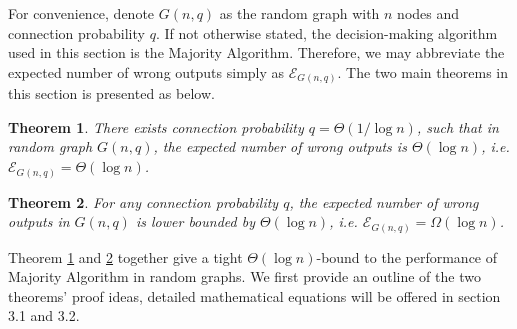 \documentclass[a4paper,UKenglish]{lipics}
\newtheorem{thm}{Theorem}[section] %
\theoremstyle{definition}
\begin{document}
For convenience, denote $G(n, q)$ as the random graph with $n$ nodes and connection probability $q$.
If not otherwise stated, the decision-making algorithm used in this section is the Majority Algorithm.
Therefore, we may abbreviate the expected number of wrong outputs simply as $\mathcal{E}_{G(n,q)}$.
The two main theorems in this section is presented as below.

\begin{thm}
\label{thm:random graph log n reachable}
There exists connection probability $q = \Theta(1/\log n)$, such that in random graph $G(n, q)$, 
	the expected number of wrong outputs is $\Theta(\log n)$,	
	i.e. $\mathcal{E}_{G(n,q)} = \Theta(\log n)$.
\end{thm}

\begin{thm}
\label{thm:random graph log n bound}
For any connection probability $q$, the expected number of wrong outputs in $G(n,q)$ is lower bounded by $\Theta(\log n)$,
	i.e. $\mathcal{E}_{G(n,q)} = \Omega(\log n)$.
\end{thm}

Theorem \ref{thm:random graph log n reachable} and \ref{thm:random graph log n bound}
	together give a tight $\Theta(\log n)$-bound to the performance of Majority Algorithm in random graphs.
We first provide an outline of the two theorems' proof ideas, detailed mathematical equations will be offered in section 3.1 and 3.2.
\end{document}
